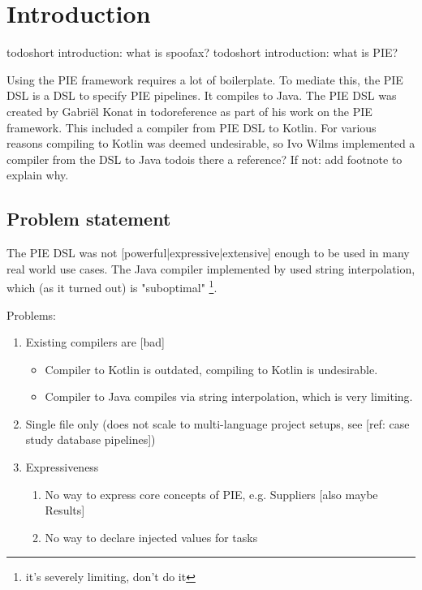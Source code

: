 
\chapter{\label{chap:introduction}Introduction}

todo{short introduction: what is spoofax?}
todo{short introduction: what is PIE?}

Using the PIE framework requires a lot of boilerplate.
To mediate this, the PIE DSL is a DSL to specify PIE pipelines.
It compiles to Java.
The PIE DSL was created by Gabriël Konat in todo{reference} as part of his work on the PIE framework.
This included a compiler from PIE DSL to Kotlin.
For various reasons compiling to Kotlin was deemed undesirable, so Ivo Wilms implemented a compiler from the DSL to Java todo{is there a reference? If not: add footnote to explain why}.

\section{\label{sec:introduction__problem_statement}Problem statement}
The PIE DSL was not [powerful|expressive|extensive] enough to be used in many real world use cases.
The Java compiler implemented by used string interpolation, which (as it turned out) is "suboptimal" \footnote{it's severely limiting, don't do it}.

Problems:
\begin{enumerate}
  \item Existing compilers are [bad]
  \begin{itemize}
     \item Compiler to Kotlin is outdated, compiling to Kotlin is undesirable.
     \item Compiler to Java compiles via string interpolation, which is very limiting.
   \end{itemize}
  \item Single file only (does not scale to multi-language project setups, see [ref: case study database pipelines])
  \item Expressiveness
  \begin{enumerate}
    \item No way to express core concepts of PIE, e.g. Suppliers [also maybe Results]
    \item No way to declare injected values for tasks
  \end{enumerate}
\end{enumerate}

